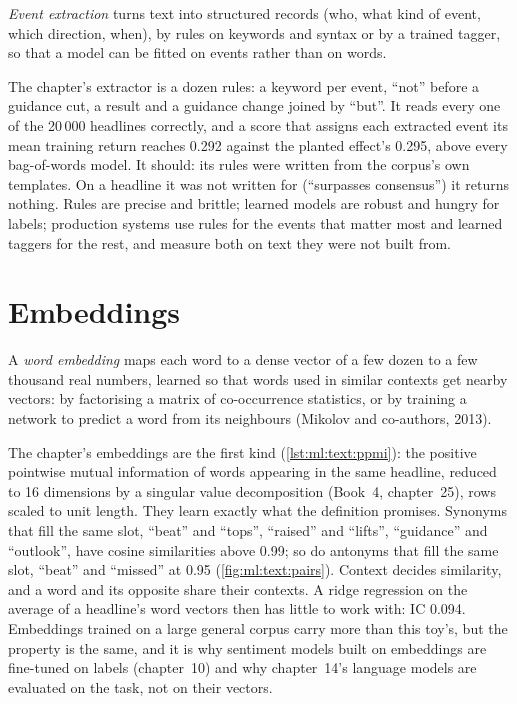\begin{definition}\label{def:ml:text-from-bag-of-words-to-embeddings:events}
\emph{Event extraction} turns text into structured records (who, what kind of event, which
direction, when), by rules on keywords and syntax or by a trained tagger, so that a model can be fitted on events rather
than on words.
\end{definition}

The chapter's extractor is a dozen rules: a keyword per event, ``not'' before a guidance cut, a result and a
guidance change joined by ``but''. It reads every one of the 20\,000 headlines correctly, and a score that assigns each
extracted event its mean training return reaches 0.292 against the planted effect's 0.295, above every bag-of-words model.
It should: its rules were written from the corpus's own templates. On a headline it was not written for (``surpasses
consensus'') it returns nothing. Rules are precise and brittle; learned models are robust and hungry for labels; production
systems use rules for the events that matter most and learned taggers for the rest, and measure both on text they were not
built from.

\section{Embeddings}

\begin{definition}\label{def:ml:text-from-bag-of-words-to-embeddings:embedding}
A \emph{word embedding} maps each word to a dense vector of a few dozen to a few thousand real numbers,
learned so that words used in similar contexts get nearby vectors: by factorising a matrix of co-occurrence statistics, or
by training a network to predict a word from its neighbours (Mikolov and co-authors, 2013).
\end{definition}

The chapter's embeddings are the first kind (\cref{lst:ml:text:ppmi}): the positive pointwise mutual information of words
appearing in the same headline, reduced to 16 dimensions by a singular value decomposition (Book~4, chapter~25), rows
scaled to unit length. They learn exactly what the definition promises. Synonyms that fill the same slot, ``beat'' and
``tops'', ``raised'' and ``lifts'', ``guidance'' and ``outlook'', have cosine similarities above 0.99; so do antonyms that
fill the same slot, ``beat'' and ``missed'' at 0.95 (\cref{fig:ml:text:pairs}). Context decides similarity, and a word and
its opposite share their contexts. A ridge regression on the average of a headline's word vectors then has little to work
with: IC 0.094. Embeddings trained on a large general corpus carry more than this toy's, but the property is the same, and
it is why sentiment models built on embeddings are fine-tuned on labels (chapter~10) and why chapter~14's language models
are evaluated on the task, not on their vectors.

